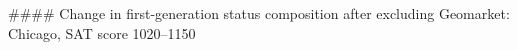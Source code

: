 #### Change in first-generation status composition after excluding Geomarket: Chicago, SAT score 1020–1150
